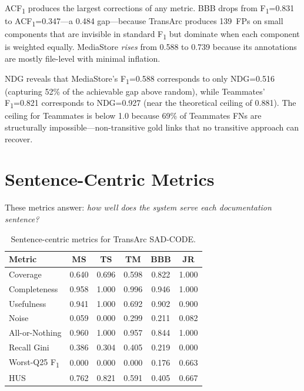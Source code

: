\documentclass[11pt,a4paper]{report}
\newcommand{\sadcode}{SAD-CODE\xspace}
\newcommand{\transarc}{TransArc\xspace}
\newcommand{\fone}{F\textsubscript{1}\xspace}
\newcommand{\acfone}{ACF\textsubscript{1}\xspace}
\begin{document}
\acfone produces the largest corrections of any metric. BBB drops from
\fone=0.831 to \acfone=0.347---a 0.484 gap---because \transarc produces
139~FPs on small components that are invisible in standard \fone but dominate
when each component is weighted equally. MediaStore \emph{rises} from 0.588 to
0.739 because its annotations are mostly file-level with minimal inflation.

NDG reveals that MediaStore's \fone=0.588 corresponds to only NDG=0.516
(capturing 52\% of the achievable gap above random), while Teammates'
\fone=0.821 corresponds to NDG=0.927 (near the theoretical ceiling of 0.881).
The ceiling for Teammates is below 1.0 because 69\% of Teammates FNs are
structurally impossible---non-transitive gold links that no transitive
approach can recover.


\section{Sentence-Centric Metrics}
\label{sec:eval:sentence}

These metrics answer: \emph{how well does the system serve each documentation
sentence?}

\begin{table}[h]
\caption{Sentence-centric metrics for \transarc \sadcode.}
\label{tab:sentence}
\centering\small
\begin{tabular}{lccccc}
\toprule
\textbf{Metric} & \textbf{MS} & \textbf{TS} & \textbf{TM} & \textbf{BBB} & \textbf{JR} \\
\midrule
Coverage           & 0.640 & 0.696 & 0.598 & 0.822 & 1.000 \\
Completeness       & 0.958 & 1.000 & 0.996 & 0.946 & 1.000 \\
Usefulness         & 0.941 & 1.000 & 0.692 & 0.902 & 0.900 \\
Noise              & 0.059 & 0.000 & 0.299 & 0.211 & 0.082 \\
All-or-Nothing     & 0.960 & 1.000 & 0.957 & 0.844 & 1.000 \\
Recall Gini        & 0.386 & 0.304 & 0.405 & 0.219 & 0.000 \\
Worst-Q25 \fone    & 0.000 & 0.000 & 0.000 & 0.176 & 0.663 \\
HUS                & 0.762 & 0.821 & 0.591 & 0.405 & 0.667 \\
\bottomrule
\end{tabular}
\end{table}
\end{document}
